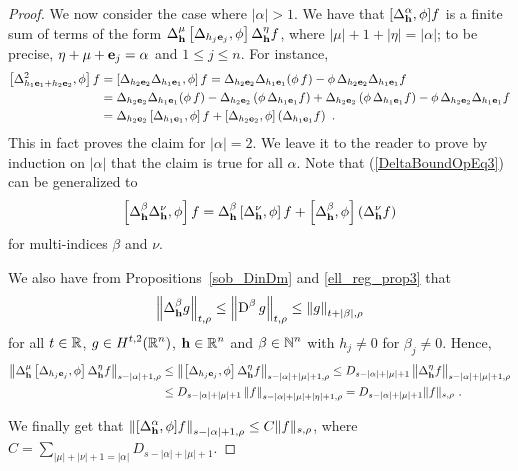 \begin{proof}
  We now consider the case where $|\alpha|>1$.
We have that $\displaystyle [\Delta^\alpha_{\mathbf{h}}, \phi] f$
is a finite sum of terms of the form $\displaystyle \Delta^{\mu}_{\mathbf{h}} \left[
\Delta_{h_j \mathbf{e}_j}, \phi\right] \Delta^{\eta}_{\mathbf{h}}f$,
where $|\mu|+1+|\eta| = |\alpha|$; to be precise,
$\eta+\mu + \mathbf{e}_j = \alpha$ and $1 \leq j \leq n$.  For instance,
\begin{align}
\left[\Delta^2_{h_1\mathbf{e}_1+h_2\mathbf{e}_2} ,\phi\right] f
&=\left[\Delta_{h_2\mathbf{e}_2} \Delta_{h_1\mathbf{e}_1} ,\phi\right] f
= \Delta_{h_2\mathbf{e}_2} \Delta_{h_1\mathbf{e}_1} (\phi \, f)
- \phi\, \Delta_{h_2\mathbf{e}_2} \Delta_{h_1\mathbf{e}_1} f \nonumber \\
&= \Delta_{h_2\mathbf{e}_2} \Delta_{h_1\mathbf{e}_1} (\phi \, f)
- \Delta_{h_2\mathbf{e}_2} \left( \phi \, \Delta_{h_1\mathbf{e}_1} f\right)
+ \Delta_{h_2\mathbf{e}_2} \left( \phi \, \Delta_{h_1\mathbf{e}_1} f\right)
- \phi\, \Delta_{h_2\mathbf{e}_2} \Delta_{h_1\mathbf{e}_1} f \nonumber \\
&= \Delta_{h_2\mathbf{e}_2} \left[ \Delta_{h_1\mathbf{e}_1} ,\phi \right] f
+ \left[ \Delta_{h_2\mathbf{e}_2}, \phi\right]
\left( \Delta_{h_1\mathbf{e}_1} f\right) \ .
\label{DeltaBoundOpEq3}
\end{align}
This in fact proves the claim for $|\alpha|=2$.  We leave it to the
reader to prove by induction on $|\alpha|$ that the claim is true for
all $\alpha$.  Note that (\ref{DeltaBoundOpEq3}) can be generalized to
\[
\left[\Delta_{\mathbf{h}}^{\beta} \Delta_{\mathbf{h}}^{\nu} ,\phi\right] f
= \Delta_{\mathbf{h}}^{\beta} \left[ \Delta_{\mathbf{h}}^{\nu} ,\phi \right] f
+ \left[ \Delta_{\mathbf{h}}^{\beta}, \phi\right]
\left( \Delta_{\mathbf{h}}^{\nu} f\right)
\]
for multi-indices $\beta$ and $\nu$.

We also have from Propositions~\ref{sob_DinDm} and \ref{ell_reg_prop3}
that
\begin{equation} \label{DeltaBoundOpEq4}
\left\| \Delta^{\beta}_{\mathbf{h}} g \right\|_{t,\rho}
\leq \left\| \operatorname{D}^{\beta} g \right\|_{t,\rho}
\leq \left\| g \right\|_{t+|\beta|,\rho}
\end{equation}
for all $t\in \mathbb{R}$, $\displaystyle g \in H^{t,2}(\mathbb{R}^n)$,
$\displaystyle \mathbf{h} \in \mathbb{R}^n$ and
$\displaystyle \beta \in \mathbb{N}^n$ with $h_j \neq 0$ for
$\beta_j \neq 0$.  Hence,
\begin{align*}
\left\| \Delta^{\mu}_{\mathbf{h}} \left[
\Delta_{h_j \mathbf{e}_j}, \phi\right] \Delta^{\eta}_{\mathbf{h}} f
\right\|_{s-|\alpha|+1,\rho}
&\leq \left\| \left[ \Delta_{h_j \mathbf{e}_j}, \phi\right]
\Delta^{\eta}_{\mathbf{h}} f\right\|_{s-|\alpha|+|\mu|+1,\rho}
\leq D_{s-|\alpha|+|\mu|+1}
\left\| \Delta^{\eta}_{\mathbf{h}} f \right\|_{s-|\alpha|+|\mu|+1,\rho} \\
& \leq D_{s-|\alpha|+|\mu|+1} \left\| f \right\|_{s-|\alpha|+|\mu|+|\eta|+1,\rho}
= D_{s-|\alpha|+|\mu|+1} \|f\|_{s,\rho} \ .
\end{align*}

We finally get that
$\displaystyle 
\left\| [\Delta^\alpha_{\mathbf{h}}, \phi] f \right\|_{s-|\alpha|+1,\rho}
\leq C \|f\|_{s,\rho}$, where
$\displaystyle C = \sum_{|\mu|+|\nu|+1 = |\alpha|} D_{s-|\alpha|+|\mu|+1}$.
\end{proof}


